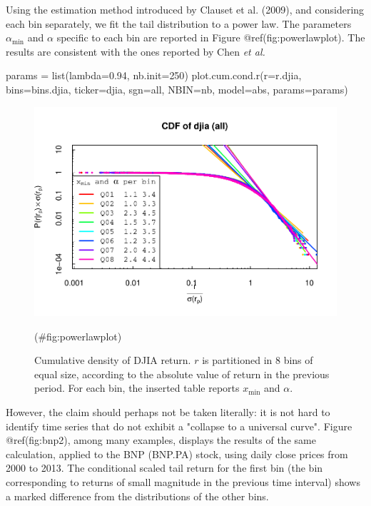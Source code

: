 \documentclass[
  11pt,
]{article}
\newenvironment{Shaded}{\begin{snugshade}}{\end{snugshade}}
\newcommand{\AttributeTok}[1]{\textcolor[rgb]{0.77,0.63,0.00}{#1}}
\newcommand{\DecValTok}[1]{\textcolor[rgb]{0.00,0.00,0.81}{#1}}
\newcommand{\FloatTok}[1]{\textcolor[rgb]{0.00,0.00,0.81}{#1}}
\newcommand{\FunctionTok}[1]{\textcolor[rgb]{0.00,0.00,0.00}{#1}}
\newcommand{\NormalTok}[1]{#1}
\newcommand{\OtherTok}[1]{\textcolor[rgb]{0.56,0.35,0.01}{#1}}
\newcommand{\StringTok}[1]{\textcolor[rgb]{0.31,0.60,0.02}{#1}}
\begin{document}
Using the estimation method introduced by Clauset et al. (2009), and
considering each bin separately, we fit the tail distribution to a power
law. The parameters \(\alpha_{\text{min}}\) and \(\alpha\) specific to
each bin are reported in Figure @ref(fig:powerlawplot). The results are
consistent with the ones reported by Chen \emph{et al.}

\begin{Shaded}
\begin{Highlighting}[]
\NormalTok{params }\OtherTok{=} \FunctionTok{list}\NormalTok{(}\AttributeTok{lambda=}\FloatTok{0.94}\NormalTok{, }\AttributeTok{nb.init=}\DecValTok{250}\NormalTok{)}
\FunctionTok{plot.cum.cond.r}\NormalTok{(}\AttributeTok{r=}\NormalTok{r.djia, }\AttributeTok{bins=}\NormalTok{bins.djia, }\AttributeTok{ticker=}\StringTok{\textquotesingle{}djia\textquotesingle{}}\NormalTok{, }\AttributeTok{sgn=}\StringTok{\textquotesingle{}all\textquotesingle{}}\NormalTok{,}
\AttributeTok{NBIN=}\NormalTok{nb, }\AttributeTok{model=}\StringTok{\textquotesingle{}abs\textquotesingle{}}\NormalTok{, }\AttributeTok{params=}\NormalTok{params)}
\end{Highlighting}
\end{Shaded}

\begin{figure}[H]
\includegraphics[width=0.7\linewidth,height=0.7\textheight]{figs/powerlawplot-1} \caption{Cumulative density of DJIA return. $r$ is partitioned in 8 bins of equal size, according to the absolute value of return in the previous period. For each bin, the inserted table reports $x_{\text{min}}$ and $\alpha$.}(\#fig:powerlawplot)
\end{figure}

However, the claim should perhaps not be taken literally: it is not hard
to identify time series that do not exhibit a "collapse to a universal
curve". Figure @ref(fig:bnp2), among many examples, displays the results
of the same calculation, applied to the BNP (BNP.PA) stock, using daily
close prices from 2000 to 2013. The conditional scaled tail return for
the first bin (the bin corresponding to returns of small magnitude in
the previous time interval) shows a marked difference from the
distributions of the other bins.
\end{document}
